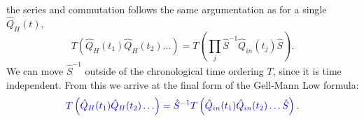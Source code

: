 \documentclass[12pt, titlepage]{article}
\begin{document}
the series and commutation follows the same argumentation as for a single $ \hat{Q}_{H}(t) $, 
\begin{equation}
T\left( 
\hat{Q}_{H}(t_1)
\hat{Q}_{H}(t_2)
\ldots
\right) 
=
T\left( 
\prod_{j}
\hat{S}^{-1}
\hat{Q}_{in}(t_{j})
\hat{S}
\right).
\end{equation}
We can move $ \hat{S}^{-1} $ outside of the chronological time ordering $ T $, since it is time independent. From this we arrive at the final form of the Gell-Mann Low formula:
\begin{equation}\label{Gell-Mann_Low_formula}
\textcolor[RGB]{0,0,204}{
T\left( 
\hat{Q}_{H}(t_1)
\hat{Q}_{H}(t_2)
\ldots
\right) 
=
\hat{S}^{-1}
T\left( 
\hat{Q}_{in}(t_{1})
\hat{Q}_{in}(t_{2})
\ldots
\hat{S}
\right).
}
\end{equation}
\end{document}
